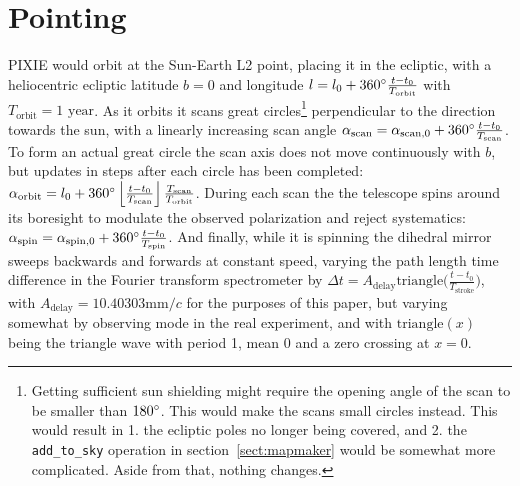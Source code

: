 \documentclass{article}
\begin{document}
\section{Pointing}
\label{sec:pointing}
PIXIE would orbit at the Sun-Earth L2 point, placing it in the ecliptic, with
a heliocentric ecliptic latitude $b=0$ and longitude $l=l_0 +
360\degree\frac{t-t_0}{T_\textrm{orbit}}$ with $T_\textrm{orbit} = 1\textrm{ year}$.
As it orbits it scans great circles\footnote{
Getting sufficient sun shielding might require the opening angle of the scan
to be smaller than $180\degree$. This would make the scans small circles instead.
This would result in 1. the ecliptic poles no longer being covered, and 2. the
\texttt{add\_to\_sky} operation in section~\ref{sect:mapmaker} would be
somewhat more complicated. Aside from that, nothing changes.}
perpendicular to the direction towards the sun, with a linearly increasing scan angle
$\alpha_\textrm{scan} = \alpha_{\textrm{scan},0} + 360\degree \frac{t-t_0}{T_\textrm{scan}}$.
To form an actual great circle the scan axis does not
move continuously with $b$, but updates in steps after each circle has been completed:
$\alpha_\textrm{orbit} = l_0 + 360\degree\left\lfloor\frac{t-t_0}{T_\textrm{scan}}\right\rfloor\frac{T_\textrm{scan}}{T_\textrm{orbit}}$.
During each scan the the telescope spins around its boresight to modulate
the observed polarization and reject systematics: $\alpha_\textrm{spin} =
\alpha_{\textrm{spin},0} + 360\degree\frac{t-t_0}{T_\textrm{spin}}$. And finally,
while it is spinning the dihedral mirror sweeps backwards and forwards at constant
speed, varying the path length time difference in the Fourier transform spectrometer
by $\Delta t = A_\textrm{delay}\textrm{triangle}\Big(\frac{t-t_0}{T_\textrm{stroke}}\Big)$,
with $A_\textrm{delay} = 10.40303 \textrm{mm}/c$ for the purposes of this paper, but
varying somewhat by observing mode in the real experiment, and with
$\textrm{triangle}(x)$ being the triangle wave with period 1, mean 0 and a zero
crossing at $x=0$.
\end{document}
